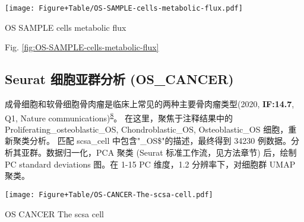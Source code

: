 \documentclass[
]{article}
\begin{document}
\begin{center}\vspace{1.5cm}\end{center}
\def\@captype{figure}
\begin{center}
\texttt{[image: Figure+Table/OS-SAMPLE-cells-metabolic-flux.pdf]}
\caption{OS SAMPLE cells metabolic flux}\label{fig:OS-SAMPLE-cells-metabolic-flux}
\end{center}

\begin{center}\vspace{1.5cm}\end{center}

Fig. \ref{fig:OS-SAMPLE-cells-metabolic-flux}

\hypertarget{seurat-ux7ec6ux80deux4e9aux7fa4ux5206ux6790-os_cancer}{%
\subsection{Seurat 细胞亚群分析 (OS\_CANCER)}\label{seurat-ux7ec6ux80deux4e9aux7fa4ux5206ux6790-os_cancer}}

成骨细胞和软骨细胞骨肉瘤是临床上常见的两种主要骨肉瘤类型(2020, \textbf{IF:14.7}, Q1, Nature communications)\textsuperscript{\protect\hyperlink{ref-Single_cell_RNA_Zhou_2020}{8}}。
在这里，聚焦于注释结果中的 Proliferating\_osteoblastic\_OS, Chondroblastic\_OS, Osteoblastic\_OS 细胞，重新聚类分析。
匹配 scsa\_cell 中包含"\_OS\$"的描述，最终得到 34230 例数据。分析其亚群。数据归一化，PCA 聚类 (Seurat 标准工作流，见方法章节) 后，绘制 PC standard deviations 图。在 1-15 PC 维度，1.2 分辨率下，对细胞群 UMAP 聚类。

\begin{center}\vspace{1.5cm}\end{center}
\def\@captype{figure}
\begin{center}
\texttt{[image: Figure+Table/OS-CANCER-The-scsa-cell.pdf]}
\caption{OS CANCER The scsa cell}\label{fig:OS-CANCER-The-scsa-cell}
\end{center}

\begin{center}\vspace{1.5cm}\end{center}
\end{document}
